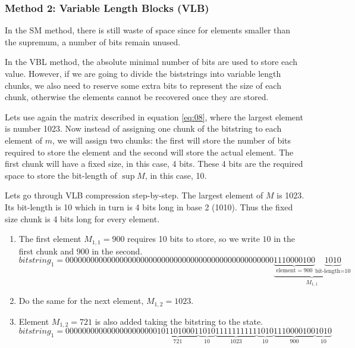\documentclass[10pt]{article}
\begin{document}
\subsubsection*{Method 2: Variable Length Blocks (VLB)}

In the SM method, there is still waste of space since for elements smaller than the supremum, a number of bits remain unused.

In the VBL method, the absolute minimal number of bits are used to store each value. However, if we are going to divide the biststrings into variable length chunks, we also need to reserve some extra bits to represent the size of each chunk, otherwise the elements cannot be recovered once they are stored.

Lets use again the matrix described in equation \ref{eq:08}, where  the largest element is number 1023. Now instead of assigning one chunk of the bitstring to each element of $m$, we will assign two chunks: the first will store the number of bits required to store the element and the second  will store the actual element. The first chunk will have a fixed size, in this case, 4 bits. These 4 bits are the required space to store the bit-length of $\sup M $, in this case, 10. 

Lets go through VLB compression step-by-step. The largest element of $M$ is 1023. Its bit-length is 10 which in turn is 4 bits long in base 2 (1010). Thus the fixed size chunk is 4 bits long for every element.

\begin{enumerate}
 \item The first element $M_{1,1}=900$ requires 10 bits to store, so we write $10$ in the first chunk and $900$ in the second.
 \begin{equation*} \label{eq:13}
 bitstring_1 = 00000000000000000000000000000000000000000000000000\underbrace{\underbrace{1110000100}_{\text{element} = 900}\underbrace{1010}_{\text{bit-length=10}}}_{M_{1,1}}
\end{equation*}
 \item Do the same for the next element, $M_{1,2}=1023$.
 \item Element $M_{1,2}=721$ is also added taking the bitstring to the state.
 \begin{equation*} \label{eq:14}
 bitstring_1 = 
 0000000000000000000000\underbrace{1011010001}_{721}\underbrace{1010}_{10}\underbrace{1111111111}_{1023}\underbrace{1010}_{10}\underbrace{1110000100}_{900}\underbrace{1010}_{10}
\end{equation*}
\end{enumerate}
\end{document}
